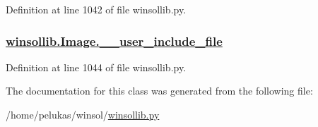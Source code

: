 Definition at line 1042 of file winsollib.py.\hypertarget{classwinsollib_1_1Image_c78c82718cbd8a1b0c562ed7d5825d7c}{
\subsubsection[\_\-\_\-user\_\-include\_\-file]{\setlength{\rightskip}{0pt plus 5cm}\hyperlink{classwinsollib_1_1Image_c78c82718cbd8a1b0c562ed7d5825d7c}{winsollib.Image.\_\-\_\-user\_\-include\_\-file}}}
\label{classwinsollib_1_1Image_c78c82718cbd8a1b0c562ed7d5825d7c}




Definition at line 1044 of file winsollib.py.

The documentation for this class was generated from the following file:\begin{CompactItemize}
\item 
/home/pelukas/winsol/\hyperlink{winsollib_8py}{winsollib.py}\end{CompactItemize}
